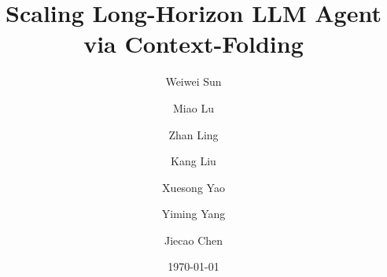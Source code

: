 \documentclass[]{bytedance_seed}
\title{Scaling Long-Horizon 
LLM Agent via Context-Folding}
\author[1,2,*]{Weiwei Sun}
\author[1,3,*]{Miao Lu}
\author[1]{Zhan Ling}
\author[1]{Kang Liu}
\author[1]{Xuesong Yao}
\author[2]{Yiming Yang}
\author[1, \dagger]{Jiecao Chen}
\affiliation[1]{ByteDance Seed}
\affiliation[2]{Carnegie Mellon University}
\affiliation[3]{Stanford University}
\date{\today}
\begin{document}
\maketitle







\clearpage

\beginappendix



% 
% 
\end{document}
